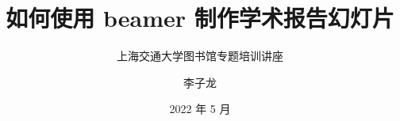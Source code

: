 
\title{如何使用 beamer 制作学术报告幻灯片}
\subtitle{上海交通大学图书馆专题培训讲座}
\author{李子龙}
\date{2022 年 5 月}
\subject{LaTeX, 幻灯片制作, SJTUBeamer}
\maketitle




\def\bottomthanks{Happy \TeX{}ing!}
\makebottom